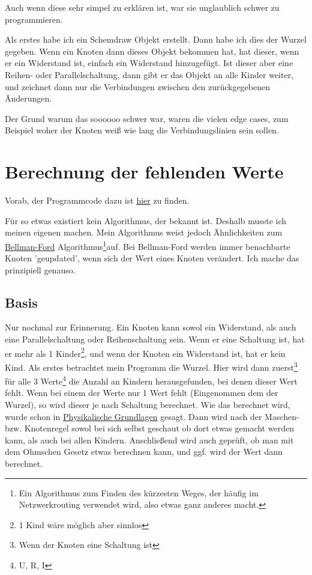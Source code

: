 \documentclass[a4paper,10pt,ngerman]{scrartcl}
\begin{document}
Auch wenn diese sehr simpel zu erklären ist, war sie unglaublich schwer zu programmieren.

Als erstes habe ich ein Schemdraw Objekt erstellt. Dann habe ich dies der Wurzel gegeben. Wenn ein Knoten dann dieses Objekt bekommen hat, hat dieser, wenn er ein Widerstand ist, einfach ein Widerstand hinzugefügt. Ist dieser aber eine Reihen- oder Parallelschaltung, dann gibt er das Objekt an alle Kinder weiter, und zeichnet dann nur die Verbindungen zwischen den zurückgegebenen Änderungen.

Der Grund warum das soooooo schwer war, waren die vielen edge cases, zum Beispiel woher der Knoten weiß wie lang die Verbindungslinien sein sollen.

\section{Berechnung der fehlenden Werte}

Vorab, der Programmcode dazu ist \hyperref[subsec:berechnung]{\underline{hier}} zu finden.

Für so etwas existiert kein Algorithmus, der bekannt ist. Deshalb musste ich meinen eigenen machen. Mein Algorithmus weist jedoch Ähnlichkeiten zum \href{https://en.wikipedia.org/wiki/Bellman\%E2\%80\%93Ford_algorithm}{\underline{Bellman-Ford}} Algorithmus\footnote{Ein Algorithmus zum Finden des kürzesten Weges, der häufig im Netzwerkrouting verwendet wird, also etwas ganz anderes macht.}auf.
Bei Bellman-Ford werden immer benachbarte Knoten 'geupdated', wenn sich der Wert eines Knoten verändert. Ich mache das prinzipiell genauso.

\subsection{Basis}

Nur nochmal zur Erinnerung. Ein Knoten kann sowol ein Widerstand, als auch eine Parallelschaltung oder Reihenschaltung sein. Wenn er eine Schaltung ist, hat er mehr als 1 Kinder\footnote{1 Kind wäre möglich aber sinnlos}, und wenn der Knoten ein Widerstand ist, hat er kein Kind.
Als erstes betrachtet mein Programm die Wurzel. Hier wird dann zuerst\footnote{Wenn der Knoten eine Schaltung ist} für alle 3 Werte\footnote{U, R, I} die Anzahl an Kindern herausgefunden, bei denen dieser Wert fehlt. Wenn bei einem der Werte nur 1 Wert fehlt (Eingenommen dem der Wurzel), so wird dieser je nach Schaltung berechnet. Wie das berechnet wird, wurde schon in \hyperref[subsec:physik]{\underline{Physikalische Grundlagen}} gesagt.
Dann wird nach der Maschen- bzw. Knotenregel sowol bei sich selbst geschaut ob dort etwas gemacht werden kann, als auch bei allen Kindern. Anschließend wird auch geprüft, ob man mit dem Ohmschen Gesetz etwas berechnen kann, und ggf. wird der Wert dann berechnet.
\end{document}
